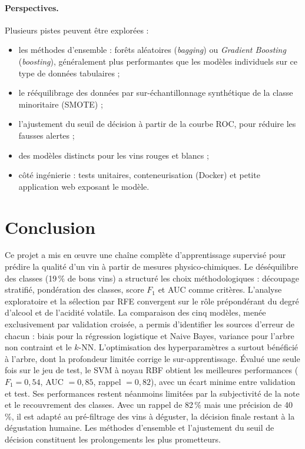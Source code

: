 \documentclass[11pt,a4paper]{article}
\newcommand{\Fun}{F_1}
\begin{document}
\paragraph{Perspectives.} Plusieurs pistes peuvent être explorées :
\begin{itemize}
  \item les méthodes d'ensemble : forêts aléatoires (\emph{bagging}) ou \emph{Gradient Boosting} (\emph{boosting}), généralement plus performantes que les modèles individuels sur ce type de données tabulaires ;
  \item le rééquilibrage des données par sur-échantillonnage synthétique de la classe minoritaire (SMOTE) ;
  \item l'ajustement du seuil de décision à partir de la courbe ROC, pour réduire les fausses alertes ;
  \item des modèles distincts pour les vins rouges et blancs ;
  \item côté ingénierie : tests unitaires, conteneurisation (Docker) et petite application web exposant le modèle.
\end{itemize}

\section{Conclusion}

Ce projet a mis en œuvre une chaîne complète d'apprentissage supervisé pour prédire la qualité d'un vin à partir de mesures physico-chimiques. Le déséquilibre des classes (19\,\% de bons vins) a structuré les choix méthodologiques : découpage stratifié, pondération des classes, score $\Fun$ et AUC comme critères. L'analyse exploratoire et la sélection par RFE convergent sur le rôle prépondérant du degré d'alcool et de l'acidité volatile. La comparaison des cinq modèles, menée exclusivement par validation croisée, a permis d'identifier les sources d'erreur de chacun : biais pour la régression logistique et Naive Bayes, variance pour l'arbre non contraint et le $k$-NN. L'optimisation des hyperparamètres a surtout bénéficié à l'arbre, dont la profondeur limitée corrige le sur-apprentissage. Évalué une seule fois sur le jeu de test, le SVM à noyau RBF obtient les meilleures performances ($\Fun = 0{,}54$, AUC $= 0{,}85$, rappel $= 0{,}82$), avec un écart minime entre validation et test. Ses performances restent néanmoins limitées par la subjectivité de la note et le recouvrement des classes. Avec un rappel de 82\,\% mais une précision de 40\,\%, il est adapté au pré-filtrage des vins à déguster, la décision finale restant à la dégustation humaine. Les méthodes d'ensemble et l'ajustement du seuil de décision constituent les prolongements les plus prometteurs.
\end{document}

